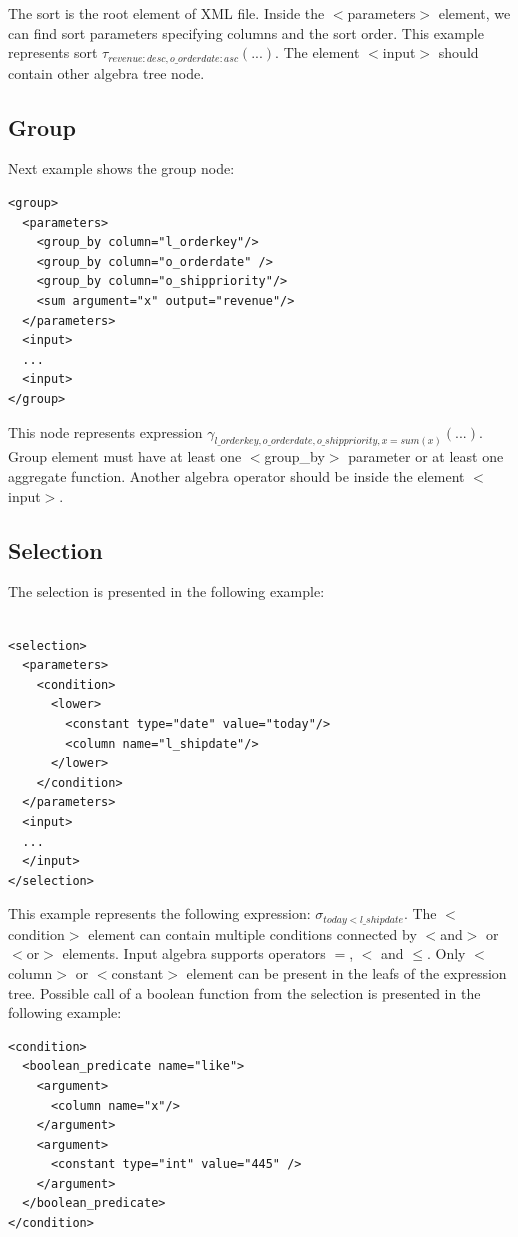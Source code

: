 The sort is the root element of XML file. Inside the $<$parameters$>$ element, we can find sort parameters specifying columns and the sort order. This example represents sort $\tau_{revenue:desc,o\_orderdate:asc}(...)$. The element $<$input$>$ should contain other algebra tree node.

\subsection{Group}

Next example shows the group node:

\begin{lstlisting}
<group>
  <parameters>
    <group_by column="l_orderkey"/>
    <group_by column="o_orderdate" />
    <group_by column="o_shippriority"/>
    <sum argument="x" output="revenue"/>
  </parameters>
  <input>
  ...
  <input>
</group>
\end{lstlisting}

This node represents expression $\gamma_{l\_orderkey,o\_orderdate,o\_shippriority,x=sum(x)}(...)$. Group element must have at least one $<$group\_by$>$  parameter or at least one aggregate function.  Another algebra operator should be inside the element $<$input$>$.

\subsection{Selection}

The selection is presented in the following example:

\begin{lstlisting}

<selection>
  <parameters>
    <condition>
      <lower>
        <constant type="date" value="today"/>
        <column name="l_shipdate"/>
      </lower>
    </condition>
  </parameters>
  <input>
  ...
  </input>
</selection>
\end{lstlisting}
This example represents the following expression: $\sigma_{today<l\_shipdate}$. The $<$condition$>$ element can contain multiple conditions connected by $<$and$>$ or $<$or$>$ elements. Input algebra supports operators $=$, $<$ and $\leq$.  Only $<$column$>$ or $<$constant$>$ element can be present in the leafs of the expression tree. Possible call of a boolean function from the selection is presented in the following example:

\begin{lstlisting}
<condition>
  <boolean_predicate name="like">
    <argument>
      <column name="x"/>
    </argument>
    <argument>
      <constant type="int" value="445" />
    </argument>
  </boolean_predicate>
</condition>
\end{lstlisting}

